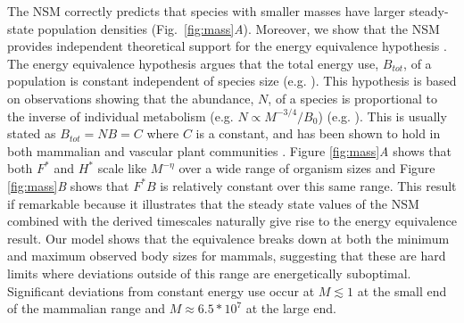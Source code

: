 \documentclass{pnastwo}
\begin{document}
\begin{article}
The NSM correctly predicts that species with smaller masses have larger steady-state population densities (Fig.~\ref{fig:mass}\emph{A}).
Moreover, we show that the NSM provides independent theoretical support for the energy equivalence hypothesis \cite{allen2002,enquist1998}.
The energy equivalence hypothesis argues that the total energy use, $B_{tot}$, of a population is constant independent of species size (e.g. \cite{allen2002,enquist1998}). %
This hypothesis is based on observations showing that the abundance, $N$, of a species is proportional to the inverse of individual metabolism (e.g. $N\propto M^{-3/4}/B_{0}$)  (e.g. \cite{allen2002,enquist1998}). 
This is usually stated as $B_{tot}=NB=C$ where $C$ is a constant, and has been shown to hold in both mammalian and vascular plant communities \cite{allen2002,enquist1998}. 
Figure \ref{fig:mass}\emph{A} shows that both $F^{*}$ and $H^{*}$ scale like $M^{-\eta}$ over a wide range of organism sizes and Figure \ref{fig:mass}\emph{B} shows that $F^{*}B$ is relatively constant over this same range. 
This result if remarkable because it illustrates that the steady state values of the NSM combined with the derived timescales naturally give rise to the energy equivalence result. 
Our model shows that the equivalence breaks down at both the minimum and maximum observed body sizes for mammals, suggesting that these are hard limits where deviations outside of this range are energetically suboptimal. %
Significant deviations from constant energy use occur at $M \lesssim 1$ at the small end of the mammalian range and $M\approx 6.5*10^7$ at the large end. 


\end{article}
\end{document}
